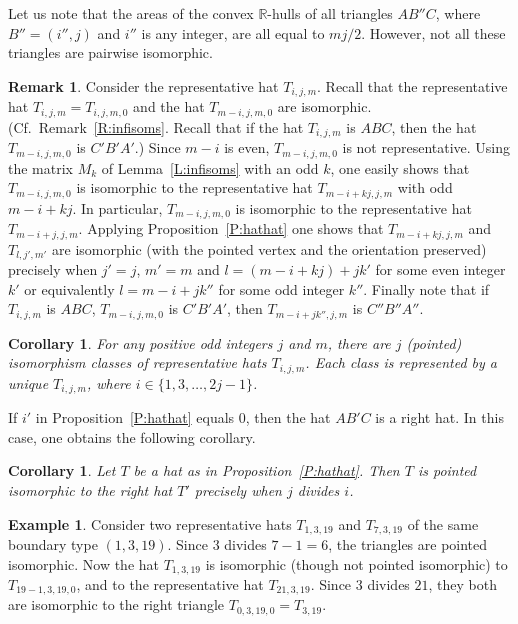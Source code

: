 \documentclass[12pt]{amsart}
\def\mbR{\mathbb{R}}
\theoremstyle{plain}
\newtheorem{corollary}[theorem]{Corollary}
\theoremstyle{definition}
\newtheorem{remark}[theorem]{Remark}
\newtheorem{example}[theorem]{Example}
\numberwithin{equation}{section}
\begin{document}
Let us note that the areas of the convex $\mbR$-hulls of all triangles $AB''C$, where $B''
= (i'',j)$ and $i''$ is any integer, are all equal to $mj/2$. However, not all these triangles
are pairwise isomorphic.



\begin{remark}\label{R:hathat}
Consider the representative hat $T_{i,j,m}$. Recall that the representative hat $T_{i,j,m} =
T_{i,j,m,0}$ and the hat $T_{m-i,j,m,0}$ are isomorphic. (Cf.~Remark~\ref{R:infisoms}. Recall that if the hat $T_{i,j,m}$ is $ABC$, then the hat $T_{m-i,j,m,0}$ is $C'B'A'$.) Since
$m-i$ is even, $T_{m-i,j,m,0}$ is not representative. Using the matrix $M_k$ of
Lemma~\ref{L:infisoms} with an odd $k$, one easily shows that $T_{m-i,j,m,0}$ is isomorphic to
the representative hat $T_{m-i+kj,j,m}$ with odd $m-i+kj$. In particular, $T_{m-i,j,m,0}$ is
isomorphic to the representative hat $T_{m-i+j,j,m}$. Applying Proposition~\ref{P:hathat} one
shows that $T_{m-i+kj,j,m}$ and $T_{l,j',m'}$ are isomorphic (with the pointed vertex and the
orientation preserved) precisely when $j' = j$, $m' = m$ and $l = (m-i+kj) + jk'$ for some even integer $k'$ or equivalently $l = m-i + jk''$ for some odd integer $k''$. Finally note that if $T_{i,j,m}$ is $ABC$, $T_{m-i,j,m,0}$ is $C'B'A'$, then $T_{m-i+jk'',j,m}$ is $C''B''A''$.
\end{remark}





\begin{corollary}\label{C:nonisomhats}
For any positive odd integers $j$ and $m$, there are $j$  (pointed) isomorphism classes of
representative hats $T_{i,j,m}$. Each class is represented by a unique $T_{i,j,m}$, where $i \in
\{1,3,\dots, 2j-1\}$.
\end{corollary}


If $i'$ in Proposition~\ref{P:hathat} equals $0$, then the hat $AB'C$ is a right hat. In this
case, one obtains the following corollary.


\begin{corollary}\label{R:hatright}
Let $T$ be a hat as in Proposition~\ref{P:hathat}. Then
$T$ is pointed isomorphic to the right hat $T'$ precisely when
$j$ divides $i$.
\end{corollary}



\begin{example}\label{Ex:isohats}
Consider two representative hats $T_{1,3,19}$ and $T_{7,3,19}$ of the same boundary type
$(1,3,19)$. Since $3$ divides $7-1 = 6$, the triangles are pointed isomorphic.
Now the hat $T_{1,3,19}$ is isomorphic (though not pointed isomorphic) to $T_{19-1,3,19,0}$, and to the representative hat $T_{21,3,19}$.
Since $3$ divides $21$, they both are isomorphic to the right triangle $T_{0,3,19,0}=T_{3,19}$.
\end{example}
\end{document}
